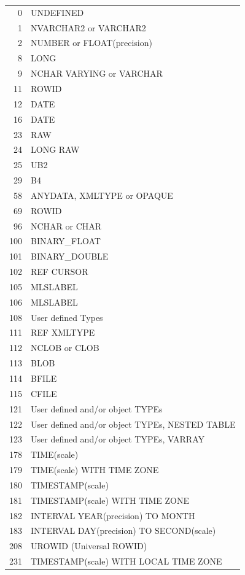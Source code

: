 \begin{appendix}
\begin{longtable}[]{@{}r|l@{}}
  0 & UNDEFINED \\
  1 & NVARCHAR2 or VARCHAR2 \\
  2 & NUMBER or FLOAT(precision) \\
  8 & LONG \\
  9 & NCHAR VARYING or VARCHAR \\
 11 & ROWID \\
 12 & DATE \\
 16 & DATE \\
 23 & RAW \\
 24 & LONG RAW \\
 25 & UB2 \\
 29 & B4 \\
 58 & ANYDATA, XMLTYPE or OPAQUE \\
 69 & ROWID \\
 96 & NCHAR or CHAR \\
100 & BINARY\_FLOAT \\
101 & BINARY\_DOUBLE \\
102 & REF CURSOR \\
105 & MLSLABEL \\
106 & MLSLABEL \\
108 & User defined Types \\
111 & REF XMLTYPE \\
112 & NCLOB or CLOB \\
113 & BLOB \\
114 & BFILE \\
115 & CFILE \\
121 & User defined and/or object TYPEs \\
122 & User defined and/or object TYPEs, NESTED TABLE \\
123 & User defined and/or object TYPEs, VARRAY \\
178 & TIME(scale) \\
179 & TIME(scale) WITH TIME ZONE \\
180 & TIMESTAMP(scale) \\
181 & TIMESTAMP(scale) WITH TIME ZONE \\
182 & INTERVAL YEAR(precision) TO MONTH \\
183 & INTERVAL DAY(precision) TO SECOND(scale) \\
208 & UROWID (Universal ROWID)\\
231 & TIMESTAMP(scale) WITH LOCAL TIME ZONE \\

\bottomrule
\end{longtable}


\end{appendix}

